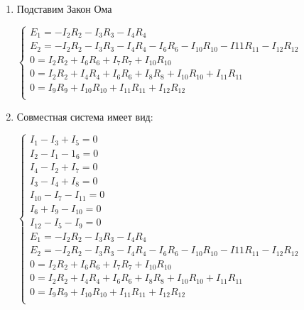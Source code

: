 \begin{enumerate}
  \item Подставим Закон Ома

  $\left\{
    \begin{array}{l}
      E_1=-I_2R_2-I_3R_3-I_4R_4\\
      E_2=-I_2R_2-I_3R_3-I_4R_4-I_6R_6-I_{10}R_{10}-I{11}R_{11}-I_{12}R_{12}\\
      0=I_2R_2+I_6R_6+I_7R_7+I_{10}R_{10}\\
      0=I_2R_2+I_4R_4+I_6R_6+I_8R_8+I_{10}R_{10}+I_{11}R_{11}\\
      0=I_9R_9+I_{10}R_{10}+I_{11}R_{11}+I_{12}R_{12}\\
    \end{array}
  \right.$

\newpage

\item Совместная система имеет вид:

$\left\{
  \begin{array}{l}
    I_1-I_3+I_5=0\\
    I_2-I_1-1_6=0\\
    I_4-I_2+I_7=0\\
    I_3-I_4+I_8=0\\
    I_{10}-I_7-I_{11}=0\\
    I_6+I_9-I_{10}=0 \\
    I_{12}-I_5-I_9=0 \\
    E_1=-I_2R_2-I_3R_3-I_4R_4\\
    E_2=-I_2R_2-I_3R_3-I_4R_4-I_6R_6-I_{10}R_{10}-I{11}R_{11}-I_{12}R_{12}\\
    0=I_2R_2+I_6R_6+I_7R_7+I_{10}R_{10}\\
    0=I_2R_2+I_4R_4+I_6R_6+I_8R_8+I_{10}R_{10}+I_{11}R_{11}\\
    0=I_9R_9+I_{10}R_{10}+I_{11}R_{11}+I_{12}R_{12}\\
  \end{array}
\right.$

\end{enumerate}

\newpage
